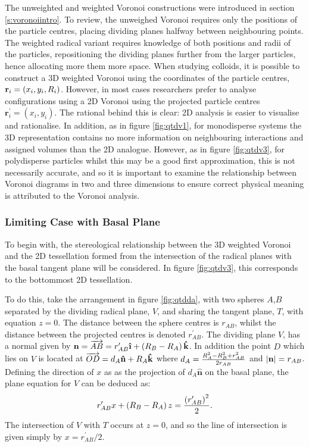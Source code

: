 The unweighted and weighted Voronoi constructions were introduced in section \ref{s:voronoiintro}.
To review, the unweighed Voronoi requires only the positions of the particle centres, placing dividing planes halfway between neighbouring points.
The weighted radical variant requires knowledge of both positions and radii of the particles, repositioning the dividing planes further from the larger particles, hence allocating more them more space.
When studying \qtd{} colloids, it is possible to construct a 3D weighted Voronoi using the coordinates of the particle centres, $\mathbf{r}_i=\left(x_i,y_i,R_i\right)$.
However, in most cases researchers prefer to analyse configurations using a 2D Voronoi using the projected particle centres $\mathbf{r}_i^\prime=\left(x_i,y_i\right)$. 
The rational behind this is clear: 2D analysis is easier to visualise and rationalise.
In addition, as in figure \ref{fig:qtdv1}, for monodisperse systems the 3D representation contains no more information on neighbouring interactions and assigned volumes than the 2D analogue.
However, as in figure \ref{fig:qtdv3}, for polydisperse particles whilst this may be a good first approximation, this is not necessarily accurate, and so it is important to examine the relationship between Voronoi diagrams in two and three dimensions to ensure correct physical meaning is attributed to the Voronoi analysis.

\subsubsection{Limiting Case with Basal Plane}

To begin with, the stereological relationship between the 3D weighted Voronoi and the 2D tessellation formed from the intersection of the radical planes with the basal tangent plane will be considered.
In figure \ref{fig:qtdv3}, this corresponds to the bottommost 2D tessellation.

To do this, take the arrangement in figure \ref{fig:qtdda}, with two spheres $A$,$B$ separated by the dividing radical plane, $V$, and sharing the tangent plane, $T$, with equation $z=0$.
The distance between the sphere centres is $r_{AB}$, whilst the distance between the projected centres is denoted $r_{AB}^\prime$.
The dividing plane $V$, has a normal given by $\mathbf{n} =\overrightarrow{AB}=r_{AB}^\prime\boldsymbol{\hat{\textbf{\i}}}+\left(\rs_B-\rs_A\right)\mathbf{\hat{k}}$.
In addition the point $D$ which lies on $V$ is located at $\overrightarrow{OD}=d_{A}\mathbf{\hat{n}}+R_A\mathbf{\hat{k}}$ where $d_{A}=\frac{R_A^2-R_B^2+r_{AB}^2}{2r_{AB}}$ and $\lvert\mathbf{n}\rvert=r_{AB}$.
Defining the direction of $x$ as as the projection of $d_A\mathbf{\hat{n}}$ on the basal plane, the plane equation for $V$ can be deduced as:
\begin{equation}
	\label{eq:plane}
	r_{AB}^\prime x+\left(R_B-R_A\right)z=\frac{\left(r_{AB}^\prime\right)^2}{2}.
\end{equation}
The intersection of $V$ with $T$ occurs at $z=0$, and so the line of intersection is given simply by $x=r_{AB}^\prime/2$.

